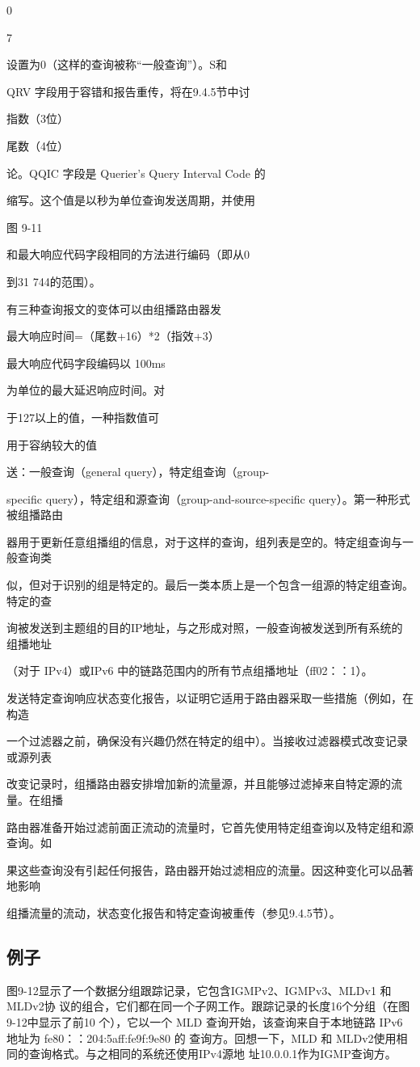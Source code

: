 0

7

设置为0（这样的查询被称“一般查询”）。S和

QRV 字段用于容错和报告重传，将在9.4.5节中讨

指数（3位）

尾数（4位）

论。QQIC 字段是 Querier’s Query Interval Code 的

缩写。这个值是以秒为单位查询发送周期，并使用

图 9-11

和最大响应代码字段相同的方法进行编码（即从0

到31 744的范围）。

有三种查询报文的变体可以由组播路由器发

最大响应时间=（尾数+16）*2（指效+3）

最大响应代码字段编码以 100ms

为单位的最大延迟响应时间。对

于127以上的值，一种指数值可

用于容纳较大的值

送：一般查询（general query），特定组查询（group-

specific query），特定组和源查询（group-and-source-specific query）。第一种形式被组播路由

器用于更新任意组播组的信息，对于这样的查询，组列表是空的。特定组查询与一般查询类

似，但对于识别的组是特定的。最后一类本质上是一个包含一组源的特定组查询。特定的查

询被发送到主题组的目的IP地址，与之形成对照，一般查询被发送到所有系统的组播地址

（对于 IPv4）或IPv6 中的链路范围内的所有节点组播地址（ff02：：1）。

发送特定查询响应状态变化报告，以证明它适用于路由器采取一些措施（例如，在构造

一个过滤器之前，确保没有兴趣仍然在特定的组中）。当接收过滤器模式改变记录或源列表

改变记录时，组播路由器安排增加新的流量源，并且能够过滤掉来自特定源的流量。在组播

路由器准备开始过滤前面正流动的流量时，它首先使用特定组查询以及特定组和源查询。如

果这些查询没有引起任何报告，路由器开始过滤相应的流量。因这种变化可以品著地影响

组播流量的流动，状态变化报告和特定查询被重传（参见9.4.5节）。

\subsection{例子}
图9-12显示了一个数据分组跟踪记录，它包含IGMPv2、IGMPv3、MLDv1 和MLDv2协
议的组合，它们都在同一个子网工作。跟踪记录的长度16个分组（在图9-12中显示了前10
个），它以一个 MLD 查询开始，该查询来自于本地链路 IPv6 地址为 fe80：：204:5aff:fe9f:9e80 的
查询方。回想一下，MLD 和 MLDv2使用相同的查询格式。与之相同的系统还使用IPv4源地
址10.0.0.1作为IGMP查询方。

